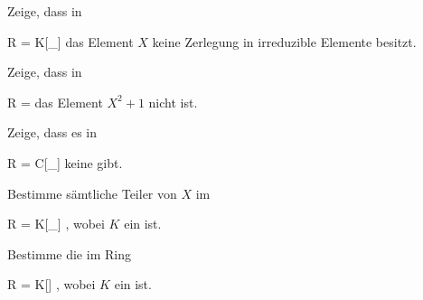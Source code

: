 {}
{





Zeige, dass in

\mavergleichskette
{\vergleichskette
{ R
}
{ = }{ K[\Q_{}]
}
{  }{
}
{    }{
}
{   }{
}
}
{}{}{}
das Element $X$ keine Zerlegung in irreduzible Elemente besitzt.





}
{} {}

{}
{





Zeige, dass in

\mavergleichskette
{\vergleichskette
{ R
}
{ = }{ \R [\Q_{\geq 0}]
}
{  }{
}
{    }{
}
{   }{
}
}
{}{}{}
das Element $X^2+1$ nicht
ist.





}
{} {}

{}
{





Zeige, dass es in

\mavergleichskette
{\vergleichskette
{ R
}
{ = }{ {\mathbb C}[\Q_{}]
}
{  }{
}
{    }{
}
{   }{
}
}
{}{}{}
keine
gibt.





}
{} {}

{}
{





Bestimme sämtliche Teiler von $X$ im

\mavergleichskette
{\vergleichskette
{ R
}
{ = }{ K[\Q_{}]
}
{  }{
}
{    }{
}
{   }{
}
}
{}{}{,}
wobei $K$ ein
ist.





}
{} {}

{}
{





Bestimme die
im Ring

\mavergleichskette
{\vergleichskette
{ R
}
{ = }{ K[\Q]
}
{  }{
}
{    }{
}
{   }{
}
}
{}{}{,}
wobei $K$ ein
ist.





}
{} {}





